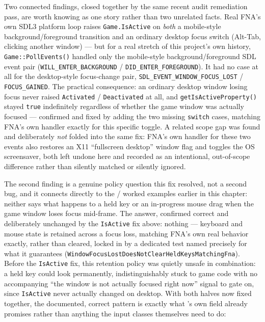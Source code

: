 Two connected findings, closed together by the same recent audit remediation pass, are worth
knowing as one story rather than two unrelated facts. Real FNA's own SDL3 platform loop raises
\texttt{Game.IsActive} on \emph{both} a mobile-style background/foreground transition and an
ordinary desktop focus switch (Alt-Tab, clicking another window) --- but for a real stretch of
this project's own history, \texttt{Game::PollEvents()} handled only the mobile-style
background/foreground SDL event pair (\texttt{WILL\_ENTER\_BACKGROUND} /
\texttt{DID\_ENTER\_FOREGROUND}). It had no case at all for the desktop-style focus-change pair,
\texttt{SDL\_EVENT\_WINDOW\_FOCUS\_LOST} / \texttt{FOCUS\_GAINED}. The practical consequence: an
ordinary desktop window losing focus
never raised \texttt{Activated} / \texttt{Deactivated} at all, and \texttt{getIsActiveProperty()}
stayed \texttt{true} indefinitely regardless of whether the game window was actually focused ---
confirmed and fixed by adding the two missing \texttt{switch} cases, matching FNA's own handler
exactly for this specific toggle. A related scope gap was found and deliberately \emph{not}
folded into the same fix: FNA's own handler for these two events also restores an X11
``fullscreen desktop'' window flag and toggles the OS screensaver, both left undone here and
recorded as an intentional, out-of-scope difference rather than silently matched or silently
ignored.

The second finding is a genuine policy question this fix resolved, not a second bug, and it
connects directly to the  /  worked examples earlier in this
chapter: neither says what happens to a held key or an in-progress mouse drag when the game
window loses focus mid-frame. The answer, confirmed correct and deliberately unchanged by the
\texttt{IsActive} fix above: nothing --- keyboard and mouse state is retained across a focus
loss, matching FNA's own real behavior exactly, rather than cleared, locked in by a dedicated
test named precisely for what it guarantees
(\texttt{WindowFocusLostDoesNotClearHeldKeysMatchingFna}). Before the \texttt{IsActive} fix, this
retention policy was quietly unsafe in combination: a held key could look permanently,
indistinguishably stuck to game code with no accompanying ``the window is not actually focused
right now'' signal to gate on, since \texttt{IsActive} never actually changed on desktop. With
both halves now fixed together, the documented, correct pattern is exactly what 's
own field already promises rather than anything the input classes themselves need to do:


